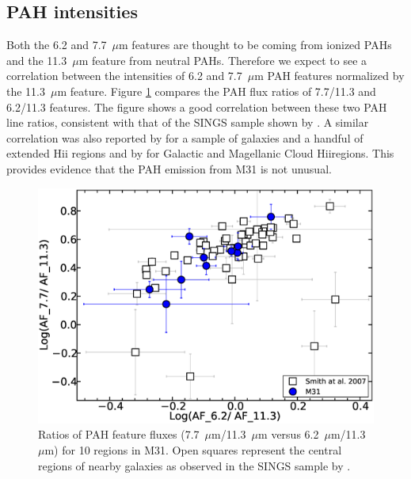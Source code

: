 %


\subsection{PAH intensities}
\label{sect:pah_ratios}

Both the 6.2 and 7.7~$\mu$m features are thought to be coming from ionized PAHs and the 11.3~$\mu$m feature from neutral PAHs. Therefore we expect to see a correlation between the intensities of 6.2 and 7.7~$\mu$m PAH features normalized by the 11.3~$\mu$m feature.  Figure \ref{PAHlines}  compares the PAH flux ratios of 7.7/11.3  and 6.2/11.3 features. The figure shows a good correlation between these two PAH line ratios, consistent with that of the SINGS sample shown by \citet{Smith:2007lr}.
A similar correlation was also reported by  \citet{Galliano2008} for a sample of galaxies and a handful of extended H{\sc ii} regions
and by \citet{Vermeij2002} for Galactic and Magellanic Cloud H{\sc ii}regions. This provides evidence that the PAH emission from M31 is not unusual. 


\begin{figure}
\centering
\includegraphics[scale = 0.25]{./fig9.eps}
\caption{Ratios of PAH feature fluxes (7.7~$\mu$m/11.3~$\mu$m versus 6.2~$\mu$m/11.3~$\mu$m) for 10 regions in M31.
Open squares represent the central regions of nearby galaxies as observed in the SINGS sample by \citet{Smith:2007lr}.
}
\label{PAHlines}
\end{figure}

